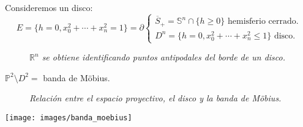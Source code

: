 \begin{prop}
Consideremos un disco:
\[
    E = \{h = 0, x_0^2 + \cdots + x_n^2 = 1\} = \partial \begin{cases}
        \overline{S}_+ = \mathbb{S}^n \cap \{h \ge 0\} \text{ hemisferio cerrado.} \\
        D^n = \{h = 0, x_0^2 + \cdots + x_n^2 \le 1\} \text{ disco.} 
    \end{cases} 
\]
\begin{figure}[H]
    \centering
    \caption{\textit{$\mathbb{R}^n$ se obtiene identificando puntos antipodales del borde de un disco.}} 
    \label{fig:proyectivo_disco}
\end{figure}
\end{prop}

\begin{ej}
$\mathbb{P}^{2} \setminus D^2 = $ banda de Möbius.
\begin{figure}[H]
    \centering
    \caption{\textit{Relación entre el espacio proyectivo, el disco y la banda de Möbius.}}
    \label{fig:proyectivo-disco-y-moebius}
\end{figure}
\begin{center}
    \texttt{[image: images/banda\_moebius]} 
\end{center}
\end{ej}

